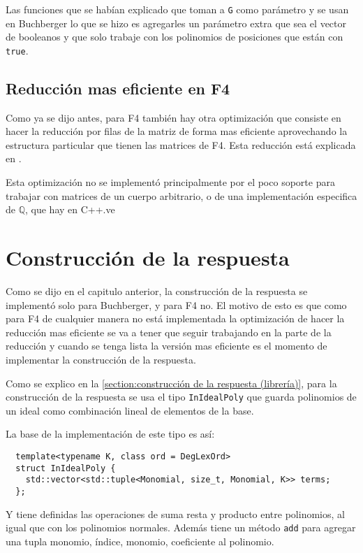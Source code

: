 \documentclass{report}
\theoremstyle{customstyle}
\theoremstyle{factstyle}
\begin{document}
Las funciones que se habían explicado que toman a \texttt{G} como parámetro y se usan en Buchberger lo que se hizo es agregarles un parámetro extra que sea el vector de booleanos y que solo trabaje con los polinomios de posiciones que están con \texttt{true}.

\subsection{Reducción mas eficiente en F4}

Como ya se dijo antes, para F4 también hay otra optimización que consiste en hacer la reducción por filas de la matriz de forma mas eficiente aprovechando la estructura particular que tienen las matrices de F4. Esta reducción está explicada en \cite{thesis:Hof20}.

Esta optimización no se implementó principalmente por el poco soporte para trabajar con matrices de un cuerpo arbitrario, o de una implementación especifica de $ℚ$, que hay en C++.ve

\section{Construcción de la respuesta}

Como se dijo en el capitulo anterior, la construcción de la respuesta se implementó solo para Buchberger, y para F4 no. El motivo de esto es que como para F4 de cualquier manera no está implementada la optimización de hacer la reducción mas eficiente se va a tener que seguir trabajando en la parte de la reducción y cuando se tenga lista la versión mas eficiente es el momento de implementar la construcción de la respuesta.

Como se explico en la \cref{section:construcción de la respuesta (librería)}, para la construcción de la respuesta se usa el tipo \texttt{InIdealPoly} que guarda polinomios de un ideal como combinación lineal de elementos de la base.

La base de la implementación de este tipo es así:

\begin{verbatim}
  template<typename K, class ord = DegLexOrd>
  struct InIdealPoly {
    std::vector<std::tuple<Monomial, size_t, Monomial, K>> terms;
  };
\end{verbatim}

Y tiene definidas las operaciones de suma resta y producto entre polinomios, al igual que con los polinomios normales. Además tiene un método \texttt{add} para agregar una tupla monomio, índice, monomio, coeficiente al polinomio.
\end{document}
